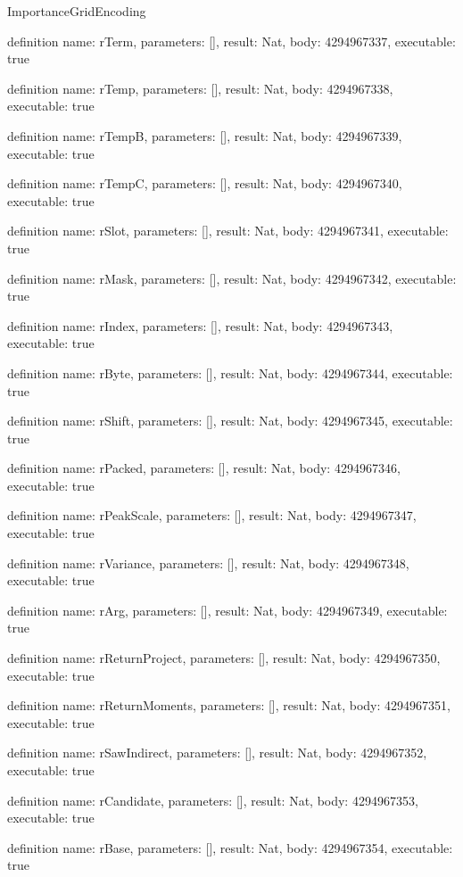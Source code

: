 \begin{lexlean}{ImportanceGridEncoding}
\begin{semanticmodule}
definition{
  name: rTerm,
  parameters: [],
  result: Nat,
  body: 4294967337,
  executable: true
}

definition{
  name: rTemp,
  parameters: [],
  result: Nat,
  body: 4294967338,
  executable: true
}

definition{
  name: rTempB,
  parameters: [],
  result: Nat,
  body: 4294967339,
  executable: true
}

definition{
  name: rTempC,
  parameters: [],
  result: Nat,
  body: 4294967340,
  executable: true
}

definition{
  name: rSlot,
  parameters: [],
  result: Nat,
  body: 4294967341,
  executable: true
}

definition{
  name: rMask,
  parameters: [],
  result: Nat,
  body: 4294967342,
  executable: true
}

definition{
  name: rIndex,
  parameters: [],
  result: Nat,
  body: 4294967343,
  executable: true
}

definition{
  name: rByte,
  parameters: [],
  result: Nat,
  body: 4294967344,
  executable: true
}

definition{
  name: rShift,
  parameters: [],
  result: Nat,
  body: 4294967345,
  executable: true
}

definition{
  name: rPacked,
  parameters: [],
  result: Nat,
  body: 4294967346,
  executable: true
}

definition{
  name: rPeakScale,
  parameters: [],
  result: Nat,
  body: 4294967347,
  executable: true
}

definition{
  name: rVariance,
  parameters: [],
  result: Nat,
  body: 4294967348,
  executable: true
}

definition{
  name: rArg,
  parameters: [],
  result: Nat,
  body: 4294967349,
  executable: true
}

definition{
  name: rReturnProject,
  parameters: [],
  result: Nat,
  body: 4294967350,
  executable: true
}

definition{
  name: rReturnMoments,
  parameters: [],
  result: Nat,
  body: 4294967351,
  executable: true
}

definition{
  name: rSawIndirect,
  parameters: [],
  result: Nat,
  body: 4294967352,
  executable: true
}

definition{
  name: rCandidate,
  parameters: [],
  result: Nat,
  body: 4294967353,
  executable: true
}

definition{
  name: rBase,
  parameters: [],
  result: Nat,
  body: 4294967354,
  executable: true
}


\end{semanticmodule}
\end{lexlean}
